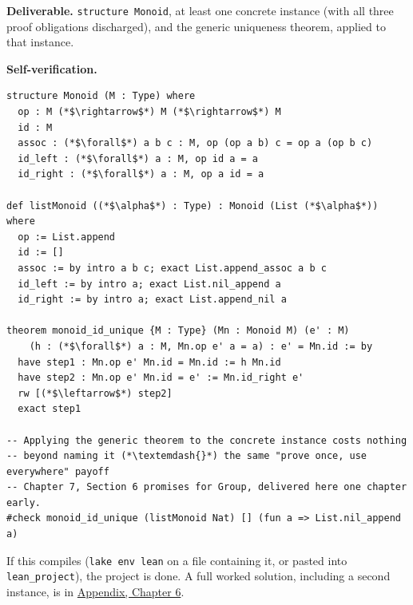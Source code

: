 \begin{pblproject}
\textbf{Deliverable.} \texttt{structure Monoid}, at least one concrete instance (with all three proof obligations discharged), and the generic uniqueness theorem, applied to that instance.

\textbf{Self-verification.}

\begin{lstlisting}
structure Monoid (M : Type) where
  op : M (*$\rightarrow$*) M (*$\rightarrow$*) M
  id : M
  assoc : (*$\forall$*) a b c : M, op (op a b) c = op a (op b c)
  id_left : (*$\forall$*) a : M, op id a = a
  id_right : (*$\forall$*) a : M, op a id = a

def listMonoid ((*$\alpha$*) : Type) : Monoid (List (*$\alpha$*)) where
  op := List.append
  id := []
  assoc := by intro a b c; exact List.append_assoc a b c
  id_left := by intro a; exact List.nil_append a
  id_right := by intro a; exact List.append_nil a

theorem monoid_id_unique {M : Type} (Mn : Monoid M) (e' : M)
    (h : (*$\forall$*) a : M, Mn.op e' a = a) : e' = Mn.id := by
  have step1 : Mn.op e' Mn.id = Mn.id := h Mn.id
  have step2 : Mn.op e' Mn.id = e' := Mn.id_right e'
  rw [(*$\leftarrow$*) step2]
  exact step1

-- Applying the generic theorem to the concrete instance costs nothing
-- beyond naming it (*\textemdash{}*) the same "prove once, use everywhere" payoff
-- Chapter 7, Section 6 promises for Group, delivered here one chapter early.
#check monoid_id_unique (listMonoid Nat) [] (fun a => List.nil_append a)
\end{lstlisting}

If this compiles (\texttt{lake env lean} on a file containing it, or pasted into \texttt{lean\_\allowbreak{}project}), the project is done. A full worked solution, including a second instance, is in \hyperref[sec:15-appendix-solutions:06-chapter-6:1]{Appendix, Chapter 6}.

\end{pblproject}

